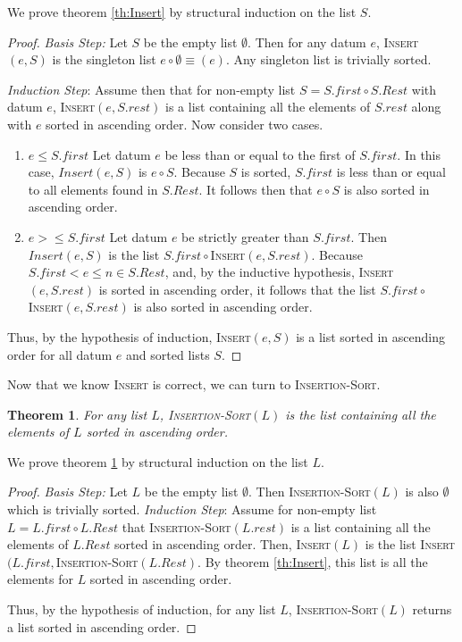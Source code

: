 \documentclass[]{tufte-handout}
\newtheorem{theorem}{Theorem}
\begin{document}
We prove theorem \ref{th:Insert} by structural induction on the list $S$. 
\begin{proof}
\textit{Basis Step:}  Let $S$ be the empty list $\emptyset$. Then for any datum $e$, \textsc{Insert}$(e,S)$ is the singleton list $e \circ \emptyset \equiv (e)$.  Any singleton list is trivially sorted.

\textit{Induction Step}:  Assume then that for non-empty list $S = S.first \circ S.Rest$ with datum $e$, \textsc{Insert}$(e,S.rest)$ is a list containing all the elements of $S.rest$ along with $e$ sorted in ascending order. Now consider two cases.
\begin{enumerate}
\item $e \leq S.first$\newline
Let datum $e$ be less than or equal to the first of $S.first$.  In this case, $Insert(e,S)$ is $e \circ S$. Because $S$ is sorted, $S.first$ is less than or equal to all elements found in $S.Rest$. It follows then that $e \circ S$ is also sorted in ascending order.

\item $e > \leq S.first$\newline
Let datum $e$ be strictly greater than $S.first$. Then $Insert(e,S)$ is the list $S.first \circ$\textsc{Insert}$(e,S.rest)$. Because $S.first < e \leq n\in S.Rest$, and, by the inductive hypothesis, \textsc{Insert}$(e,S.rest)$ is sorted in ascending order, it follows that the list $S.first \circ$\textsc{Insert}$(e,S.rest)$ is also sorted in ascending order. 
\end{enumerate}
Thus, by the hypothesis of induction, \textsc{Insert}$(e,S)$ is a list sorted in ascending order for all datum $e$ and sorted lists $S$.
\end{proof}

Now that we know \textsc{Insert} is correct, we can turn to \textsc{Insertion-Sort}.

\begin{theorem}
For any list $L$, \textsc{Insertion-Sort}$(L)$ is the list containing all the elements of $L$ sorted in ascending order.
\label{th:ISort}
\end{theorem}

We prove theorem \ref{th:ISort} by structural induction on the list $L$.
\begin{proof}
\textit{Basis Step:} Let $L$ be the empty list $\emptyset$. Then \textsc{Insertion-Sort}$(L)$ is also $\emptyset$ which is trivially sorted.
\textit{Induction Step}: Assume for non-empty list $L = L.first \circ L.Rest$ that \textsc{Insertion-Sort}$(L.rest)$ is a list containing all the elements of $L.Rest$ sorted in ascending order.  Then, \textsc{Insert}$(L)$ is the list  \textsc{Insert}$(L.first,$\textsc{Insertion-Sort}$(L.Rest)$.  By theorem \ref{th:Insert}, this list is all the elements for $L$ sorted in ascending order. 

Thus, by the hypothesis of induction, for any list $L$, \textsc{Insertion-Sort}$(L)$ returns a list sorted in ascending order.
\end{proof}
\end{document}
